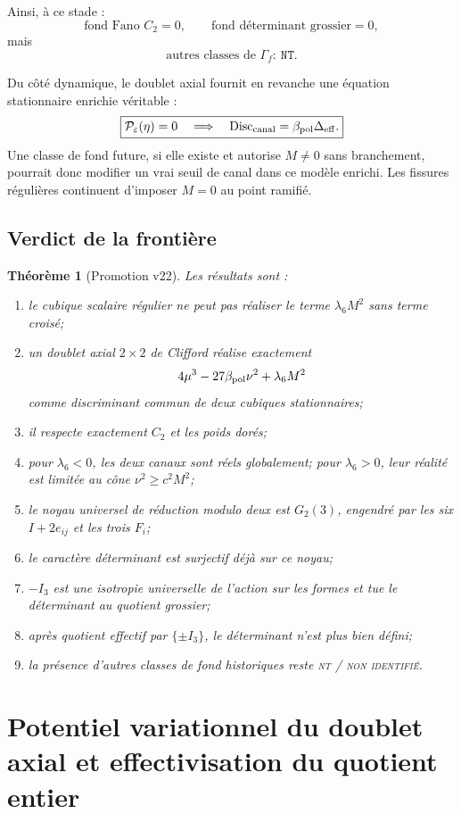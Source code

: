 \documentclass[11pt,a4paper]{article}
\newtheorem{theorem}{Théorème}[section]
\newcommand{\statusNT}{\textsc{nt / non identifié}}
\begin{document}
Ainsi, à ce stade :
\[
\boxed{
\text{fond Fano }C_2=0,
\qquad
\text{fond déterminant grossier}=0,
}
\]
mais
\[
\boxed{
\text{autres classes de }\Gamma_f:
\ \texttt{NT}.}
\]

Du côté dynamique, le doublet axial fournit en revanche une équation stationnaire enrichie véritable :
\[
\boxed{
\mathcal P_\varepsilon(\eta)=0
\quad\Longrightarrow\quad
\operatorname{Disc}_{\rm canal}
=
\beta_{\rm pol}\Delta_{\rm eff}.}
\]
Une classe de fond future, si elle existe et autorise $M\neq0$ sans branchement, pourrait donc modifier un vrai seuil de canal dans ce modèle enrichi. Les fissures régulières continuent d'imposer $M=0$ au point ramifié.

\subsection{Verdict de la frontière}

\begin{theorem}[Promotion v22]\label{thm:v22-verdict}
Les résultats sont :
\begin{enumerate}[label=\textup{(\roman*)}]
\item le cubique scalaire régulier ne peut pas réaliser le terme $\lambda_6M^2$ sans terme croisé;
\item un doublet axial $2\times2$ de Clifford réalise exactement
\[
4\mu^3-27\beta_{\rm pol}\nu^2+\lambda_6M^2
\]
comme discriminant commun de deux cubiques stationnaires;
\item il respecte exactement $C_2$ et les poids dorés;
\item pour $\lambda_6<0$, les deux canaux sont réels globalement; pour $\lambda_6>0$, leur réalité est limitée au cône $\nu^2\ge c^2M^2$;
\item le noyau universel de réduction modulo deux est $G_2(3)$, engendré par les six $I+2e_{ij}$ et les trois $F_i$;
\item le caractère déterminant est surjectif déjà sur ce noyau;
\item $-I_3$ est une isotropie universelle de l'action sur les formes et tue le déterminant au quotient grossier;
\item après quotient effectif par $\{\pm I_3\}$, le déterminant n'est plus bien défini;
\item la présence d'autres classes de fond historiques reste \statusNT{}.
\end{enumerate}
\end{theorem}


\section{Potentiel variationnel du doublet axial et effectivisation du quotient entier}\label{sec:v23-variational-effective-quotient}
\end{document}
